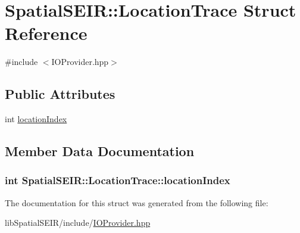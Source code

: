 \hypertarget{structSpatialSEIR_1_1LocationTrace}{\section{Spatial\-S\-E\-I\-R\-:\-:Location\-Trace Struct Reference}
\label{structSpatialSEIR_1_1LocationTrace}
}


{\ttfamily \#include $<$I\-O\-Provider.\-hpp$>$}

\subsection*{Public Attributes}
\begin{DoxyCompactItemize}
\item 
int \hyperlink{structSpatialSEIR_1_1LocationTrace_a364483b6a73e18bac6c9c9b7ab6af67e}{location\-Index}
\end{DoxyCompactItemize}


\subsection{Member Data Documentation}
\hypertarget{structSpatialSEIR_1_1LocationTrace_a364483b6a73e18bac6c9c9b7ab6af67e}{
\subsubsection[{location\-Index}]{\setlength{\rightskip}{0pt plus 5cm}int Spatial\-S\-E\-I\-R\-::\-Location\-Trace\-::location\-Index}}\label{structSpatialSEIR_1_1LocationTrace_a364483b6a73e18bac6c9c9b7ab6af67e}


The documentation for this struct was generated from the following file\-:\begin{DoxyCompactItemize}
\item 
lib\-Spatial\-S\-E\-I\-R/include/\hyperlink{IOProvider_8hpp}{I\-O\-Provider.\-hpp}\end{DoxyCompactItemize}
